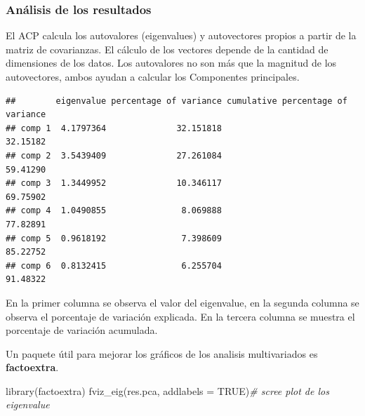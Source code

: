 \documentclass[
]{book}
\newenvironment{Shaded}{\begin{snugshade}}{\end{snugshade}}
\newcommand{\AttributeTok}[1]{\textcolor[rgb]{0.77,0.63,0.00}{#1}}
\newcommand{\CommentTok}[1]{\textcolor[rgb]{0.56,0.35,0.01}{\textit{#1}}}
\newcommand{\ConstantTok}[1]{\textcolor[rgb]{0.00,0.00,0.00}{#1}}
\newcommand{\DecValTok}[1]{\textcolor[rgb]{0.00,0.00,0.81}{#1}}
\newcommand{\FunctionTok}[1]{\textcolor[rgb]{0.00,0.00,0.00}{#1}}
\newcommand{\NormalTok}[1]{#1}
\newcommand{\OtherTok}[1]{\textcolor[rgb]{0.56,0.35,0.01}{#1}}
\newcommand{\SpecialCharTok}[1]{\textcolor[rgb]{0.00,0.00,0.00}{#1}}
\begin{document}
\hypertarget{anuxe1lisis-de-los-resultados}{%
\subsubsection{Análisis de los resultados}\label{anuxe1lisis-de-los-resultados}}

El ACP calcula los autovalores (eigenvalues) y autovectores propios a partir de la matriz de covarianzas. El cálculo de los vectores depende de la cantidad de dimensiones de los datos. Los autovalores no son más que la magnitud de los autovectores, ambos ayudan a calcular los Componentes principales.

\begin{Shaded}
\end{Shaded}

\begin{verbatim}
##        eigenvalue percentage of variance cumulative percentage of variance
## comp 1  4.1797364              32.151818                          32.15182
## comp 2  3.5439409              27.261084                          59.41290
## comp 3  1.3449952              10.346117                          69.75902
## comp 4  1.0490855               8.069888                          77.82891
## comp 5  0.9618192               7.398609                          85.22752
## comp 6  0.8132415               6.255704                          91.48322
\end{verbatim}

En la primer columna se observa el valor del eigenvalue, en la segunda columna se observa el porcentaje de variación explicada. En la tercera columna se muestra el porcentaje de variación acumulada.

Un paquete útil para mejorar los gráficos de los analisis multivariados es \textbf{factoextra}.

\begin{Shaded}
\begin{Highlighting}[]
\FunctionTok{library}\NormalTok{(factoextra)}
\FunctionTok{fviz\_eig}\NormalTok{(res.pca, }\AttributeTok{addlabels =} \ConstantTok{TRUE}\NormalTok{)}\CommentTok{\# scree plot de los eigenvalue}
\end{Highlighting}
\end{Shaded}
\end{document}
